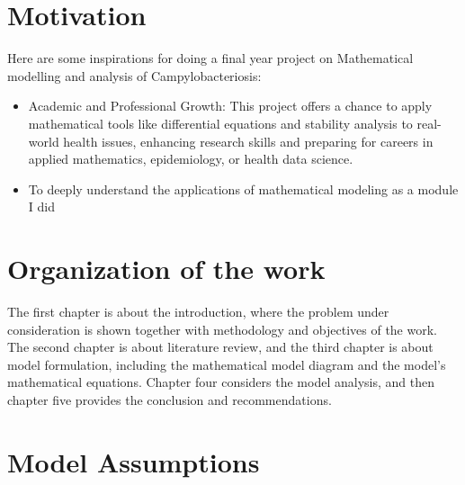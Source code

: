 \documentclass[a4paper,12pt]{report}
\begin{document}
 \section{ Motivation}
 Here are some inspirations for doing a final year project on Mathematical modelling and analysis of Campylobacteriosis: 
 \begin{itemize}
     \item Academic and Professional Growth: This project offers a chance to apply mathematical tools like differential equations and stability analysis to real-world health issues, enhancing research skills and preparing for careers in applied mathematics, epidemiology, or health data science.
     \item To deeply understand the applications of mathematical modeling as a module I did
 \end{itemize}
 \section{ Organization of the work}
 The first chapter is about the introduction, where the problem under consideration is shown together with methodology and objectives of the work. The second chapter is about literature review, and the third chapter is about model formulation, including the mathematical model diagram and the model's mathematical equations. Chapter four considers the model analysis, and then chapter five provides the conclusion and recommendations. 
\newpage
\section{Model Assumptions}
\end{document}
